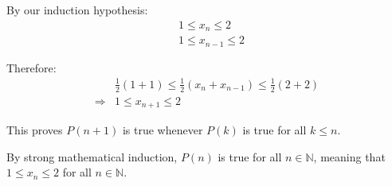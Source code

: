 \documentclass{article}
\begin{document}
By our induction hypothesis:
\begin{align*}
   & 1 \leq x_n \leq 2 \\
   & 1 \leq x_{n-1} \leq 2
\end{align*}

Therefore:
\begin{align*}
   & \frac{1}{2}(1 + 1) \leq \frac{1}{2}(x_n + x_{n-1}) \leq \frac{1}{2}(2 + 2) \\
   \Rightarrow & 1 \leq x_{n+1} \leq 2
\end{align*}

This proves $P(n+1)$ is true whenever $P(k)$ is true for all $k \leq n$.

By strong mathematical induction, $P(n)$ is true for all $n \in \mathbb{N}$, meaning that $1 \leq x_n \leq 2$ for all $n \in \mathbb{N}$.
\end{document}
